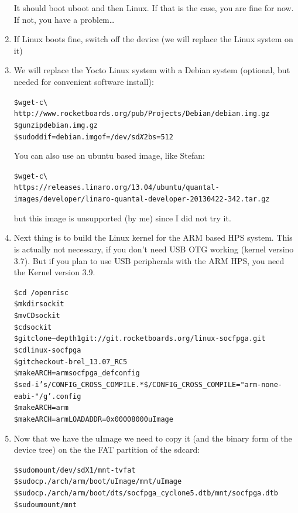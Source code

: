 \documentclass[twoside]{article}
\begin{document}
\begin{enumerate}
  It should boot uboot and then Linux. If that is the case, you are
  fine for now. If not, you have a problem\dots

\item If Linux boots fine, switch off the device (we will replace the
  Linux system on it)

\item We will replace the Yocto Linux system with a Debian system
  (optional, but needed for convenient software install):
  \begin{alltt}
\$ wget -c \textbackslash
http://www.rocketboards.org/pub/Projects/Debian/debian.img.gz
\$ gunzip debian.img.gz
\$ sudo dd if=debian.img of=/dev/sd\emph{X}2 bs=512
  \end{alltt}

You can also use an ubuntu based image, like Stefan:
\begin{scriptsize}
  \begin{alltt}
\$ wget -c \textbackslash
https://releases.linaro.org/13.04/ubuntu/quantal-images/developer/linaro-quantal-developer-20130422-342.tar.gz
  \end{alltt}
\end{scriptsize}
but this image is unsupported (by me) since I did not try it.

\item Next thing is to build the Linux kernel for the ARM based HPS
  system. This is actually not necessary, if you don't need USB OTG
  working (kernel versino 3.7). But if you plan to use USB peripherals
  with the ARM HPS, you need the Kernel version 3.9.

  \begin{alltt}
\$ cd ~/openrisc
\$ mkdir sockit
\$ mv CD sockit
\$ cd sockit
\$ git clone --depth 1 git://git.rocketboards.org/linux-socfpga.git 
\$ cd linux-socfpga
\$ git checkout -b rel_13.07_RC5
\$ make ARCH=arm socfpga_defconfig
\$ sed -i 's/CONFIG_CROSS_COMPILE.*\$/CONFIG_CROSS_COMPILE="arm-none-eabi-"/g' .config
\$ make ARCH=arm
\$ make ARCH=arm LOADADDR=0x00008000 uImage
  \end{alltt}

\item Now that we have the uImage we need to copy it (and the binary
  form of the device tree) on the the FAT partition of the sdcard:
  \begin{alltt}
\$ sudo mount /dev/sd{X}1 /mnt -t vfat
\$ sudo cp ./arch/arm/boot/uImage /mnt/uImage
\$ sudo cp ./arch/arm/boot/dts/socfpga_cyclone5.dtb /mnt/socfpga.dtb
\$ sudo umount /mnt
  \end{alltt}


\end{enumerate}
\end{document}
